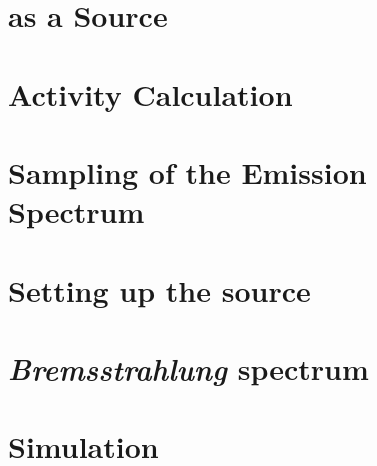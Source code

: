 
\section{ as a Source}

\newpage
\section{Activity Calculation}


\section{Sampling of the Emission Spectrum}


\section{Setting up the source}


\section{\emph{Bremsstrahlung} spectrum}


\section{Simulation}
